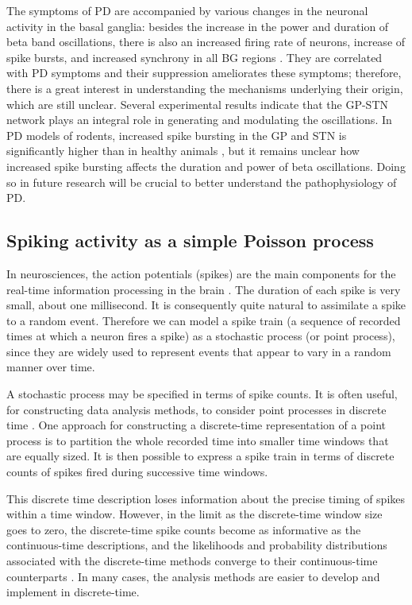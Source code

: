 \documentclass{article}
\begin{document}
The symptoms of PD are accompanied by various changes in the neuronal activity in the basal ganglia: besides the increase in the power and duration of beta band oscillations, there is also an increased firing rate of neurons, increase of spike bursts, and increased synchrony in all BG regions \citep{Bahu}. They are correlated with PD symptoms and their suppression ameliorates these symptoms; therefore, there is a great interest in understanding the mechanisms underlying their origin, which are still unclear. Several experimental results indicate that the GP-STN network plays an integral role in generating and modulating the oscillations\citep{Bahu}.
In PD models of rodents, increased spike bursting in the GP and STN is significantly higher than in healthy animals \citep{Bahu}, but it remains unclear how increased spike bursting affects the duration and power of beta oscillations. Doing so in future research will be crucial to better understand the pathophysiology of PD.

\subsection{Spiking activity as a simple Poisson process}

In neurosciences, the action potentials (spikes) are the main components for the real-time information processing in the brain \citep{Eden}. 
The duration of each spike is very small, about one millisecond. 
It is consequently quite natural to assimilate a spike to a random event. 
Therefore we can model a spike train (a sequence of recorded times at which a neuron fires a spike) as a stochastic process (or point process), since they are widely used to represent events that appear to vary in a random manner over time.

A stochastic process may be specified in terms of spike counts. 
It is often useful, for constructing data analysis methods, to consider point processes in discrete time \citep{Eden}. 
One approach for constructing a discrete-time representation of a point process is to partition the whole recorded time into smaller time windows that are equally sized. 
It is then possible to express a spike train in terms of discrete counts of spikes fired during successive time windows. 

This discrete time description loses information about the precise timing of spikes within a time window. 
However, in the limit as the discrete-time window size goes to zero, the discrete-time spike counts become as informative as the continuous-time descriptions, and the likelihoods and probability distributions associated with the discrete-time methods converge to their continuous-time counterparts \citep{Eden}. 
In many cases, the analysis methods are easier to develop and implement in discrete-time.    
\end{document}
